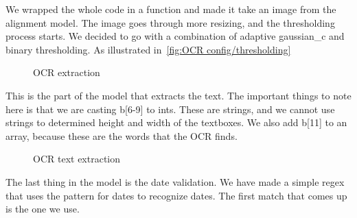 We wrapped the whole code in a function and made it take an image from the alignment model.
The image goes through more resizing, and the thresholding process starts.
We decided to go with a combination of adaptive gaussian\_c and binary thresholding.
As illustrated in~\ref{fig:OCR config/thresholding}


\begin{figure}[h]
    \caption{OCR extraction}
    \label{fig:OCR text extraction}
\end{figure}

This is the part of the model that extracts the text.
The important things to note here is that we are casting b[6-9] to ints.
These are strings, and we cannot use strings to determined height and width of the textboxes.
We also add b[11] to an array, because these are the words that the OCR finds.

\clearpage

\begin{figure}[h]
    \caption{OCR text extraction}
    \label{fig:OCR date extraction}
\end{figure}

The last thing in the model is the date validation.
We have made a simple regex that uses the pattern for dates to recognize dates.
The first match that comes up is the one we use.
